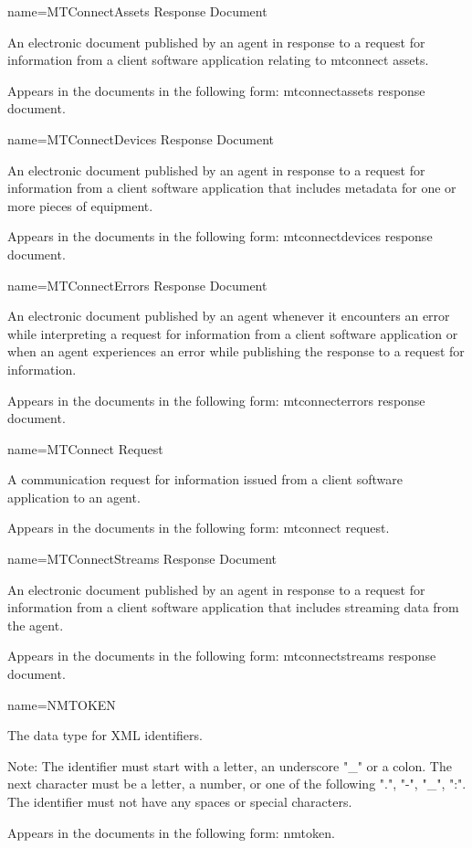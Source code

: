 {
  name={MTConnectAssets Response Document}
}
{
	An electronic document published by an \gls{agent} in response to a \gls{request} for information from a client software application relating to \glspl{mtconnect asset}.

	Appears in the documents in the following form: \gls{mtconnectassets response document}.
}


{
  name={MTConnectDevices Response Document}
}
{
	An electronic document published by an \gls{agent} in response to a \gls{request} for information from a client software application that includes \gls{metadata} for one or more pieces of equipment.

	Appears in the documents in the following form: \gls{mtconnectdevices response document}.
}


{
  name={MTConnectErrors Response Document}
}
{
	An electronic document published by an \gls{agent} whenever it encounters an error while interpreting a \gls{request} for information from a client software application or when an \gls{agent} experiences an error while publishing the \gls{response} to a \gls{request} for information.

	Appears in the documents in the following form: \gls{mtconnecterrors response document}.
}


{
  name={MTConnect Request}
}
{
	A communication request for information issued from a client software application to an \gls{agent}.

	Appears in the documents in the following form: \gls{mtconnect request}.
}


{
  name={MTConnectStreams Response Document}
}
{
	An electronic document published by an \gls{agent} in response to a \gls{request} for information from a client software application that includes \gls{streaming data} from the \gls{agent}.

	Appears in the documents in the following form: \gls{mtconnectstreams response document}.
}


{
  name={\normalfont NMTOKEN}
}
{
	The data type for XML identifiers.

	\begin{note}
	Note: The identifier must start with a letter, an underscore "\_" or a colon.  The next character must be a letter, a number, or one of the following ".", "-", "\_", ":".  The identifier must not have any spaces or special characters.
	\end{note}

	Appears in the documents in the following form: \gls{nmtoken}.
}


